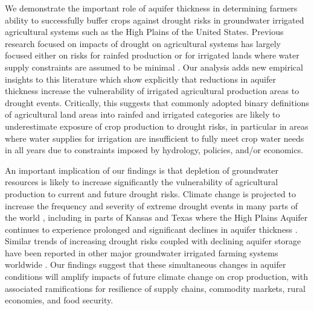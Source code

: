 \documentclass[
]{article}
\begin{document}
We demonstrate the important role of aquifer thickness in determining farmers ability to successfully buffer crops against drought risks in groundwater irrigated agricultural systems such as the High Plains of the United States. Previous research focused on impacts of drought on agricultural systems has largely focused either on risks for rainfed production \citep{schlenker2009nonlinear, lobell2014greater, schlenker2010robust, zhou2020connections, borgomeo2020impact} or for irrigated lands where water supply constraints are assumed to be minimal \citep{kuwayama2019estimating, zipper2016drought, zhu2022untangling, zhu2022warming, lu2020mapping, davis2019sensitivity, li2018changes, luan2021combined}. Our analysis adds new empirical insights to this literature which show explicitly that reductions in aquifer thickness increase the vulnerability of irrigated agricultural production areas to drought events. Critically, this suggests that commonly adopted binary definitions of agricultural land areas into rainfed and irrigated categories are likely to underestimate exposure of crop production to drought risks, in particular in areas where water supplies for irrigation are insufficient to fully meet crop water needs in all years due to constraints imposed by hydrology, policies, and/or economics.

An important implication of our findings is that depletion of groundwater resources is likely to increase significantly the vulnerability of agricultural production to current and future drought risks. Climate change is projected to increase the frequency and severity of extreme drought events in many parts of the world \citep{ukkola2020robust, chiang2021evidence, cook2020twenty}, including in parts of Kansas and Texas \citep{bradford2020robust, cook2022projected, mullens2019quantitative} where the High Plains Aquifer continues to experience prolonged and significant declines in aquifer thickness \citep{scanlon2012groundwater, haacker2016water, cotterman2018groundwater}. Similar trends of increasing drought risks coupled with declining aquifer storage have been reported in other major groundwater irrigated farming systems worldwide \citep{wada2010global, doll2014global, famiglietti2014global, feng2018groundwater, bierkens2019non}. Our findings suggest that these simultaneous changes in aquifer conditions will amplify impacts of future climate change on crop production, with associated ramifications for resilience of supply chains, commodity markets, rural economies, and food security.
\end{document}

